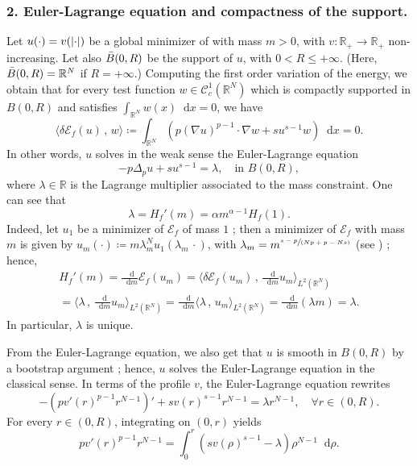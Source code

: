 \documentclass[JEP,XML,SOM,Unicode,published]{cedram}
\newcommand{\spfrac}[2]{{\sfrac{#1}{(#2)}}}
\theoremstyle{plain}
\theoremstyle{definition}
\newcommand{\dd}{\mathop{}\mathopen{}\mathrm{d}}
\newcommand{\R}{\mathbb{R}}
\newcommand{\ener}{\mathcal{E}}
\DeclarePairedDelimiter{\abs}{\lvert}{\rvert}
\begin{document}
\subsubsection*{\textup{2}. Euler-Lagrange equation and compactness of the support.} Let $u(\cdot)=v(\abs{\cdot})$ be a global minimizer of  with mass $m>0$, with $v:\R_+\to\R_+$ non-increasing. Let also $\Bar B(0,R)$ be the support of $u$, with $0<R\leq +\infty$. (Here, $\Bar B(0,R)=\R^N$ if $R=+\infty$.) Computing the first order variation of the energy, we obtain that for every test function $w\in\mathcal{C}_c^1(\R^N)$ which is compactly supported in $B(0,R)$ and satisfies $\int_{\R^N}w(x)\dd x=0$, we have\vspace*{-3pt}
\begin{equation}
\label{firstOrderConditionU}
\langle \delta \ener_f(u)\,,\, w \rangle \coloneqq \int_{\R^N} (p(\nabla u)^{p-1}\cdot\nabla w+ su^{s-1}w)\dd x= 0.
\end{equation}
In other words, $u$ solves in the weak sense the Euler-Lagrange equation\vspace*{-3pt}
\[
-p\Delta_p u+su^{s-1}=\lambda, \quad\text{in }B(0,R),
\]
where $\lambda\in\R$ is the Lagrange multiplier associated to the mass constraint. One can see that\vspace*{-3pt}
\[\lambda=H_f'(m)=\alpha m^{\alpha-1}H_f(1).\]
Indeed, let $u_1$ be a minimizer of $\ener_f$ of mass $1$ ; then a minimizer of $\ener_f$ with mass $m$ is given by $u_m(\cdot)\coloneqq m\lambda_m^N u_1(\lambda_m\,\cdot)$, with $\lambda_m=m^\spfrac{s-p}{Np+p-Ns}$ (see ) ; hence,\vspace*{-3pt}
\begin{multline}
H_f'(m)=\frac{\dd}{\dd m}\ener_f(u_m
)=\langle\delta\ener_f(u_m)\,,\, \frac{\dd}{\dd m}u_m \rangle_{L^2(\R^N)}\\[-3pt]
=\langle\lambda\,,\, \frac{\dd}{\dd m}u_m \rangle_{L^2(\R^N)}=\frac{\dd}{\dd m}\langle\lambda\,,\, u_m \rangle_{L^2(\R^N)}=\frac{\dd}{\dd m}(\lambda m) =\lambda.
\end{multline}
In particular, $\lambda$ is unique.

From the Euler-Lagrange equation, we also get that $u$ is smooth in $B(0,R)$ by a bootstrap argument ; hence, $u$ solves the Euler-Lagrange equation in the classical sense. In terms of the profile $v$, the Euler-Lagrange equation rewrites
\begin{equation}
\label{EulerLagrange}
-(pv'(r)^{p-1}r^{N-1})'+sv(r)^{s-1}r^{N-1}=\lambda r^{N-1},\quad\forall r\in(0,R).
\end{equation}
For every $r\in (0,R)$, integrating  on $(0,r)$ yields\vspace*{-3pt}
\begin{equation}
\label{integrationODE}
pv'(r)^{p-1}r^{N-1}=\int_0^r(sv(\rho)^{s-1}-\lambda)\rho^{N-1}\dd \rho.
\end{equation}
\end{document}
